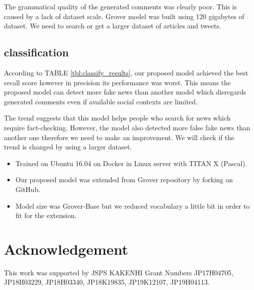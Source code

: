 \documentclass[conference]{IEEEtran}
\begin{document}
The grammatical quality of the generated comments was clearly poor.
This is caused by a lack of dataset scale. 
Grover model was built using 120 gigabytes of dataset\cite{NIPS2019_9106}.
We need to search or get a larger dataset of articles and tweets.

\subsection{classification}
According to TABLE \ref{tbl:classify_results}, our proposed model achieved the best recall score however in precision its performance was worst.
This means the proposed model can detect more fake news than another model which disregards generated comments even if available social contexts are limited. 

The trend suggests that this model helps people who search for news which require fact-checking. 
However, the model also detected more false fake news than another one therefore we need to make an improvement.
We will check if the trend is changed by using a larger dataset.

\label{app:settings}
\begin{itemize}[]
    \item Trained on Ubuntu 16.04 on Docker in Linux server with TITAN X (Pascal).
    \item Our proposed model was extended from Grover repository by forking on GitHub.
    \item Model size was Grover-Base but we reduced vocabulary a little bit in order to fit for the extension.
\end{itemize}

\section*{Acknowledgement}
This work was supported by JSPS KAKENHI Grant Numbers JP17H04705, JP18H03229, JP18H03340, JP18K19835, JP19K12107, JP19H04113.



\end{document}

